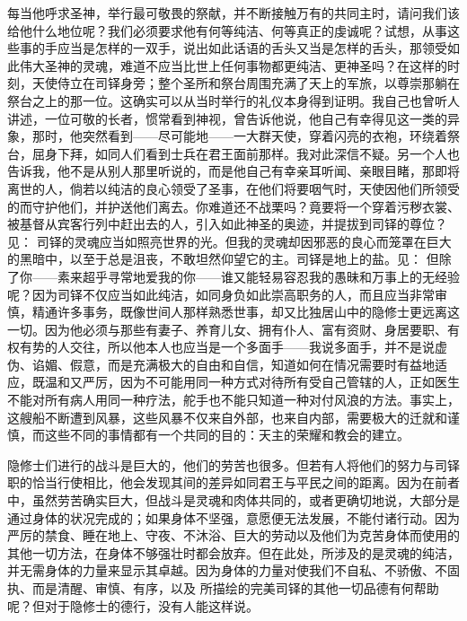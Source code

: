 每当他呼求圣神，举行最可敬畏的祭献，并不断接触万有的共同主时，请问我们该给他什么地位呢？我们必须要求他有何等纯洁、何等真正的虔诚呢？试想，从事这些事的手应当是怎样的一双手，说出如此话语的舌头又当是怎样的舌头，那领受如此伟大圣神的灵魂，难道不应当比世上任何事物都更纯洁、更神圣吗？在这样的时刻，天使侍立在司铎身旁；整个圣所和祭台周围充满了天上的军旅，以尊崇那躺在祭台之上的那一位。这确实可以从当时举行的礼仪本身得到证明。我自己也曾听人讲述，一位可敬的长者，惯常看到神视，曾告诉他说，他自己有幸得见这一类的异象，那时，他突然看到——尽可能地——一大群天使，穿着闪亮的衣袍，环绕着祭台，屈身下拜，如同人们看到士兵在君王面前那样。我对此深信不疑。另一个人也告诉我，他不是从别人那里听说的，而是他自己有幸亲耳听闻、亲眼目睹，那即将离世的人，倘若以纯洁的良心领受了圣事，在他们将要咽气时，天使因他们所领受的而守护他们，并护送他们离去。你难道还不战栗吗？竟要将一个穿着污秽衣裳、被基督从宾客行列中赶出去的人，引入如此神圣的奥迹，并提拔到司铎的尊位？见： 司铎的灵魂应当如照亮世界的光。但我的灵魂却因邪恶的良心而笼罩在巨大的黑暗中，以至于总是沮丧，不敢坦然仰望它的主。司铎是地上的盐。见： 但除了你——素来超乎寻常地爱我的你——谁又能轻易容忍我的愚昧和万事上的无经验呢？因为司铎不仅应当如此纯洁，如同身负如此崇高职务的人，而且应当非常审慎，精通许多事务，既像世间人那样熟悉世事，却又比独居山中的隐修士更远离这一切。因为他必须与那些有妻子、养育儿女、拥有仆人、富有资财、身居要职、有权有势的人交往，所以他本人也应当是一个多面手——我说多面手，并不是说虚伪、谄媚、假意，而是充满极大的自由和自信，知道如何在情况需要时有益地适应，既温和又严厉，因为不可能用同一种方式对待所有受自己管辖的人，正如医生不能对所有病人用同一种疗法，舵手也不能只知道一种对付风浪的方法。事实上，这艘船不断遭到风暴，这些风暴不仅来自外部，也来自内部，需要极大的迁就和谨慎，而这些不同的事情都有一个共同的目的：天主的荣耀和教会的建立。\par

隐修士们进行的战斗是巨大的，他们的劳苦也很多。但若有人将他们的努力与司铎职的恰当行使相比，他会发现其间的差异如同君王与平民之间的距离。因为在前者中，虽然劳苦确实巨大，但战斗是灵魂和肉体共同的，或者更确切地说，大部分是通过身体的状况完成的；如果身体不坚强，意愿便无法发展，不能付诸行动。因为严厉的禁食、睡在地上、守夜、不沐浴、巨大的劳动以及他们为克苦身体而使用的其他一切方法，在身体不够强壮时都会放弃。但在此处，所涉及的是灵魂的纯洁，并无需身体的力量来显示其卓越。因为身体的力量对使我们不自私、不骄傲、不固执、而是清醒、审慎、有序，以及  所描绘的完美司铎的其他一切品德有何帮助呢？但对于隐修士的德行，没有人能这样说。\par

